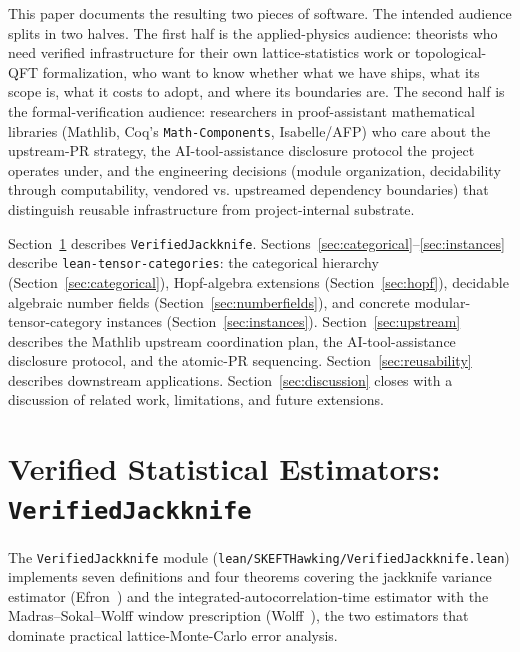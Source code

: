 \documentclass[11pt]{article}
\begin{document}
This paper documents the resulting two pieces of software. The
intended audience splits in two halves. The first half is the
applied-physics audience: theorists who need verified
infrastructure for their own lattice-statistics work or
topological-QFT formalization, who want to know whether what we
have ships, what its scope is, what it costs to adopt, and where
its boundaries are. The second half is the formal-verification
audience: researchers in proof-assistant mathematical libraries
(Mathlib, Coq's \texttt{Math-Components}, Isabelle/AFP) who care
about the upstream-PR strategy, the AI-tool-assistance disclosure
protocol the project operates under, and the engineering decisions
(module organization, decidability through computability, vendored
vs. upstreamed dependency boundaries) that distinguish reusable
infrastructure from project-internal substrate.

Section~\ref{sec:jackknife} describes \texttt{VerifiedJackknife}.
Sections~\ref{sec:categorical}--\ref{sec:instances} describe
\texttt{lean-tensor-categories}: the categorical hierarchy
(Section~\ref{sec:categorical}), Hopf-algebra extensions
(Section~\ref{sec:hopf}), decidable algebraic number fields
(Section~\ref{sec:numberfields}), and concrete modular-tensor-category
instances (Section~\ref{sec:instances}).
Section~\ref{sec:upstream} describes the Mathlib upstream
coordination plan, the AI-tool-assistance disclosure protocol, and
the atomic-PR sequencing.
Section~\ref{sec:reusability} describes downstream applications.
Section~\ref{sec:discussion} closes with a discussion of related work,
limitations, and future extensions.


\section{Verified Statistical Estimators: \texttt{VerifiedJackknife}}
\label{sec:jackknife}

The \texttt{VerifiedJackknife} module
(\texttt{lean/SKEFTHawking/VerifiedJackknife.lean}) implements
seven definitions and four theorems covering the jackknife variance
estimator (Efron~\cite{efron1982}) and the
integrated-autocorrelation-time estimator with the
Madras--Sokal--Wolff window prescription
(Wolff~\cite{wolff2004}), the two estimators that dominate
practical lattice-Monte-Carlo error analysis.
\end{document}
